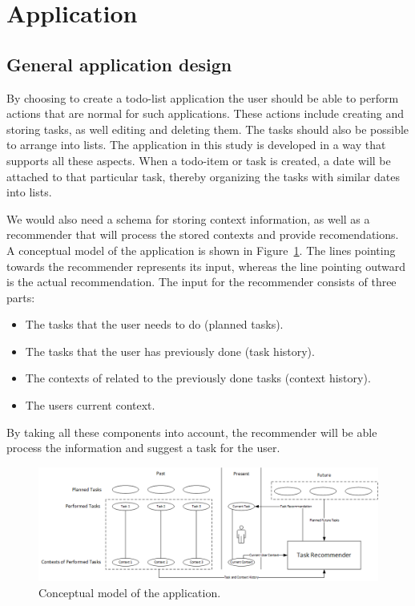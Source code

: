 \section{Application}

\subsection{General application design}
By choosing to create a todo-list application the user should be able to perform actions that are normal for such applications. These actions include creating and storing tasks, as well editing and deleting them. The tasks should also be possible to arrange into lists. The application in this study is developed in a way that supports all these aspects. When a todo-item or task is created, a date will be attached to that particular task, thereby organizing the tasks with similar dates into lists.

We would also need a schema for storing context information, as well as a recommender that will process the stored contexts and provide recomendations. A conceptual model of the application is shown in Figure~\ref{fig:conceptualmodel}. The lines pointing towards the recommender represents its input, whereas the line pointing outward is the actual recommendation. The input for the recommender consists of three parts:
\begin{itemize}
	\item The tasks that the user needs to do (planned tasks).
	\item The tasks that the user has previously done (task history).
	\item The contexts of related to the previously done tasks (context history).
	\item The users current context.
\end{itemize}
By taking all these components into account, the recommender will be able process the information and suggest a task for the user.

\begin{figure}[tbp]
  \centering
  \includegraphics[width=\textwidth]{figures/ConceptualDiagram.png}
  \caption[Conceptual model]{Conceptual model of the application.}
  \label{fig:conceptualmodel}
\end{figure}


